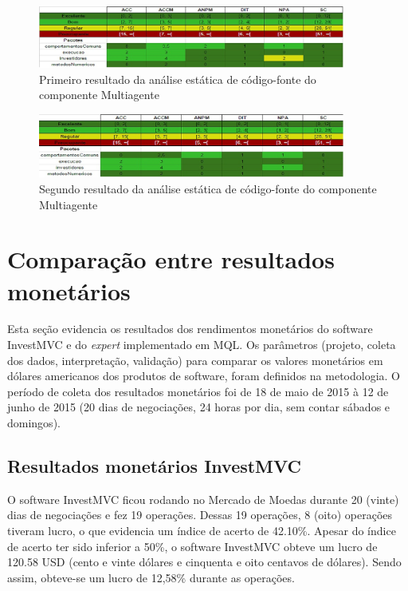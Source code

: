 \begin{figure}[H]
\centering
\includegraphics[width=0.9\textwidth]{figuras/analiseinicial}
\caption{Primeiro resultado da análise estática de código-fonte do componente Multiagente}
\label{analiseinicial}
\end{figure}

\begin{figure}[H]
\centering
\includegraphics[width=0.9\textwidth]{figuras/analisefinal}
\caption{Segundo resultado da análise estática de código-fonte do componente Multiagente}
\label{analisefinal}
\end{figure}

\section{Comparação entre resultados monetários}
Esta seção evidencia os resultados dos rendimentos monetários do software InvestMVC e do \textit{expert} implementado em MQL. Os parâmetros (projeto, coleta dos dados, interpretação, validação) para comparar os valores monetários em dólares americanos dos produtos de software, foram definidos na metodologia. O período de coleta dos resultados monetários foi de 18 de maio de 2015 à 12 de junho de 2015 (20 dias de negociações, 24 horas por dia, sem contar sábados e domingos).

\subsection{Resultados monetários InvestMVC}
O software InvestMVC ficou rodando no Mercado de Moedas durante 20 (vinte) dias de negociações e fez 19 operações. Dessas 19 operações, 8 (oito) operações tiveram lucro, o que evidencia um índice de acerto de 42.10\%. Apesar do índice de acerto ter sido inferior a 50\%, o software InvestMVC obteve um lucro de 120.58 USD (cento e vinte dólares e cinquenta e oito centavos de dólares). Sendo assim, obteve-se um lucro de 12,58\% durante as operações.


